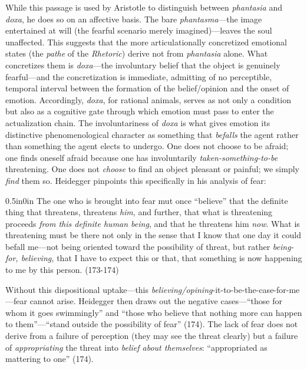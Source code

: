 \documentclass{article}
\begin{document}
While this passage is used by Aristotle to distinguish between \textit{phantasia} and \textit{doxa}, he does so on an affective basis. The bare \textit{phantasma}---the image entertained at will (the fearful scenario merely imagined)---leaves the soul unaffected. This suggests that the more articulationally concretized emotional states (the \textit{pathe} of the \textit{Rhetoric}) derive not from \textit{phantasia} alone. What concretizes them is \textit{doxa}---the involuntary belief that the object is genuinely fearful---and the concretization is immediate, admitting of no perceptible, temporal interval between the formation of the belief/opinion and the onset of emotion. Accordingly, \textit{doxa}, for rational animals, serves as not only a condition but also as a cognitive gate through which emotion must pass to enter the actualization chain. The involuntariness of \textit{doxa} is what gives emotion its distinctive phenomenological character as something that \textit{befalls} the agent rather than something the agent elects to undergo. One does not choose to be afraid; one finds oneself afraid because one has involuntarily \textit{taken-something-to-be} threatening. One does not \textit{choose} to find an object pleasant or painful; we simply \textit{find} them so. Heidegger pinpoints this specifically in his analysis of fear: 
\begin{adjustwidth}{0.5in}{0in}
    The one who is brought into fear mut once ``believe'' that the definite thing that threatens, threatens \textit{him}, and further, that what is threatening proceeds \textit{from this definite human being}, and that he threatens him \textit{now}. What is threatening must be there not only in the sense that I know that one day it could befall me---not being oriented toward the possibility of threat, but rather \textit{being-for, believing,} that I have to expect this or that, that something is now happening to me by this person. (173-174)
\end{adjustwidth}
Without this dispositional uptake---this \textit{believing/opining}-it-to-be-the-case-for-me---fear cannot arise. Heidegger then draws out the negative cases---``those for whom it goes swimmingly'' and ``those who believe that nothing more can happen to them''---``stand outside the possibility of fear'' (174). The lack of fear does not derive from a failure of perception (they may see the threat clearly) but a failure of \textit{appropriating} the threat into \textit{belief about themselves}: ``appropriated as mattering to one'' (174). 
\end{document}
